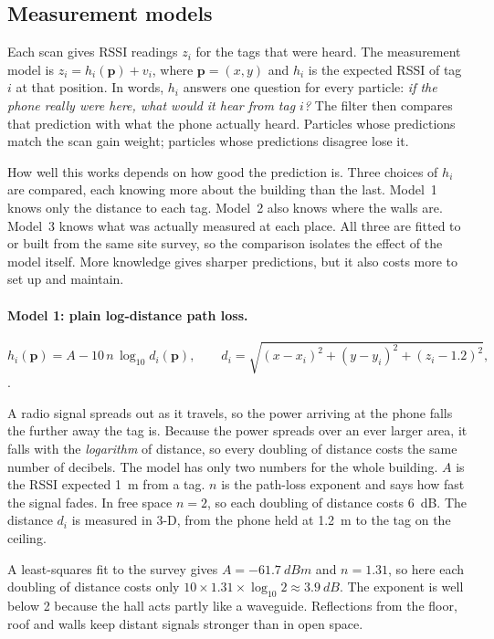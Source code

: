 \documentclass[11pt,a4paper]{article}
\begin{document}
\subsection{Measurement models}

\label{sec:models}
Each scan gives RSSI readings $z_i$ for the tags that were heard. The measurement model
is $z_i = h_i(\mathbf{p}) + v_i$, where $\mathbf{p}=(x,y)$ and $h_i$ is the expected RSSI
of tag $i$ at that position. In words, $h_i$ answers one question for every particle:
\emph{if the phone really were here, what would it hear from tag $i$?} The filter then
compares that prediction with what the phone actually heard. Particles whose predictions
match the scan gain weight; particles whose predictions disagree lose it.

How well this works depends on how good the prediction is. Three choices of $h_i$ are
compared, each knowing more about the building than the last. Model~1 knows only the
distance to each tag. Model~2 also knows where the walls are. Model~3 knows what was
actually measured at each place. All three are fitted to or built from the same site
survey, so the comparison isolates the effect of the model itself. More knowledge gives
sharper predictions, but it also costs more to set up and maintain.

\paragraph{Model 1: plain log-distance path loss.}
\begin{equation}[H]
  h_i(\mathbf{p}) = A - 10\,n\,\log_{10} d_i(\mathbf{p}),
  \qquad d_i = \sqrt{(x-x_i)^2+(y-y_i)^2+(z_i-1.2)^2},
  \label{eq:plain}
\end{equation} .

A radio signal spreads out as it travels, so the power arriving at the phone
falls the further away the tag is. Because the power spreads over an ever larger area,
it falls with the \emph{logarithm} of distance, so every doubling of distance costs the same
number of decibels. The model has only two numbers for the whole building. $A$ is the
RSSI expected \SI{1}{m} from a tag. $n$ is the path-loss exponent and says how fast the signal fades. In free space $n=2$, so each doubling of distance costs \SI{6}{dB}. The distance $d_i$ is measured in 3-D,
from the phone held at \SI{1.2}{m} to the tag on the ceiling.

A least-squares fit to the survey gives $A=\SI{-61.7}{dBm}$ and $n=1.31$, so here each
doubling of distance costs only $10 \times 1.31 \times \log_{10}2 \approx \SI{3.9}{dB}$.
The exponent is well below 2 because the hall acts partly like a waveguide.
Reflections from the floor, roof and walls keep distant signals stronger than in open
space.
\end{document}
